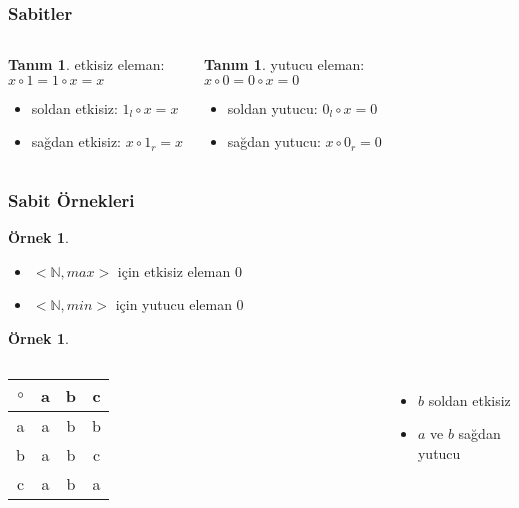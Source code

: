 \documentclass[dvipsnames]{beamer}
\theoremstyle{definition}
\newtheorem{tanim}[theorem]{Tanım}
\theoremstyle{example}
\newtheorem{ornek}[theorem]{Örnek}
\theoremstyle{plain}
\begin{document}
\begin{frame}
  \frametitle{Sabitler}

  \begin{columns}
    \begin{tanim}
      \alert{etkisiz eleman}:\\
      $x \circ 1 = 1 \circ x = x$

      \pause
      \begin{itemize}
        \item soldan etkisiz: $1_l \circ x = x$
        \item sağdan etkisiz: $x \circ 1_r = x$
      \end{itemize}
    \end{tanim}

    \pause
    \begin{tanim}
      \alert{yutucu eleman}:\\
      $x \circ 0 = 0 \circ x = 0$

      \pause
      \begin{itemize}
        \item soldan yutucu: $0_l \circ x = 0$
        \item sağdan yutucu: $x \circ 0_r = 0$
      \end{itemize}
    \end{tanim}
  \end{columns}
\end{frame}

\begin{frame}
  \frametitle{Sabit Örnekleri}

  \begin{ornek}
    \begin{itemize}
      \item $<\mathbb{N}, max>$ için etkisiz eleman $0$
      \item $<\mathbb{N}, min>$ için yutucu eleman $0$
    \end{itemize}
  \end{ornek}

  \pause
  \begin{ornek}
    \begin{columns}
      \begin{tabular}{c||c|c|c}
        $\circ$ & a & b & c \\ \hline\hline
              a & a & b & b \\ \hline
              b & a & b & c \\ \hline
              c & a & b & a
      \end{tabular}

      \begin{itemize}
        \item $b$ soldan etkisiz
        \item $a$ ve $b$ sağdan yutucu
      \end{itemize}
    \end{columns}
  \end{ornek}
\end{frame}
\end{document}
